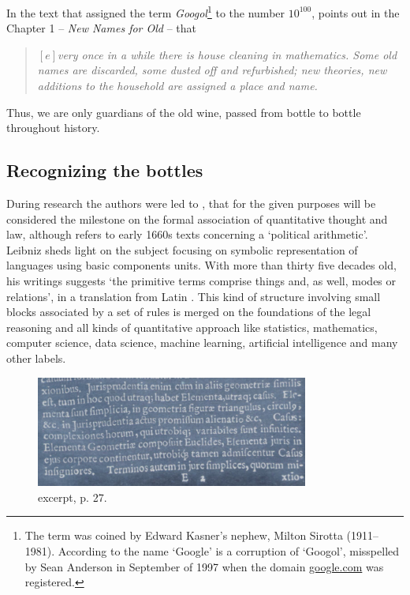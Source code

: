 \documentclass[a4paper]{exam}
\theoremstyle{plain}
\begin{document}
In the text that assigned the term \textit{Googol}\footnote{ The term was coined by Edward Kasner's nephew, Milton Sirotta (1911–1981). According to \cite{koller2004origin} the name `Google' is a corruption of `Googol', misspelled by Sean Anderson in September of 1997 when the domain \href{https://google.com}{google.com} was registered.} to the number $10^{100}$, \cite{kasner1940mathematics} points out in the Chapter 1 -- \textit{New Names for Old} -- that

\begin{quote}
\textit{$\left[e\right]$very once in a while there is house cleaning in mathematics. Some old names are discarded, some dusted off and refurbished; new theories, new additions to the household are assigned a place and name.}  \cite[p. 3]{kasner1940mathematics}
\end{quote}

Thus, we are only guardians of the old wine, passed from bottle to bottle throughout history.


\subsection{Recognizing the bottles}
During research the authors were led to \cite{leibniz1666dissertatio}, that for the given purposes will be considered the milestone on the formal association of quantitative thought and law, although \cite{friendly2008guerry} refers to early 1660s texts concerning a `political arithmetic'. Leibniz sheds light on the subject focusing on symbolic representation of languages using basic components units. With more than thirty five decades old, his writings suggests `the primitive terms comprise things and, as well, modes or relations', in a translation from Latin \cite{amunategui2014symbolic}. This kind of structure involving small blocks associated by a set of rules is merged on the foundations of the legal reasoning and all kinds of quantitative approach like statistics, mathematics, computer science, data science, machine learning, artificial intelligence and many other labels.

\begin{figure}[!h]
  \begin{center}
    \includegraphics[width=0.8\textwidth]{leibniz.png}
  \caption{\cite{leibniz1666dissertatio} excerpt, p. 27.}
  \end{center}
\end{figure}
\end{document}
